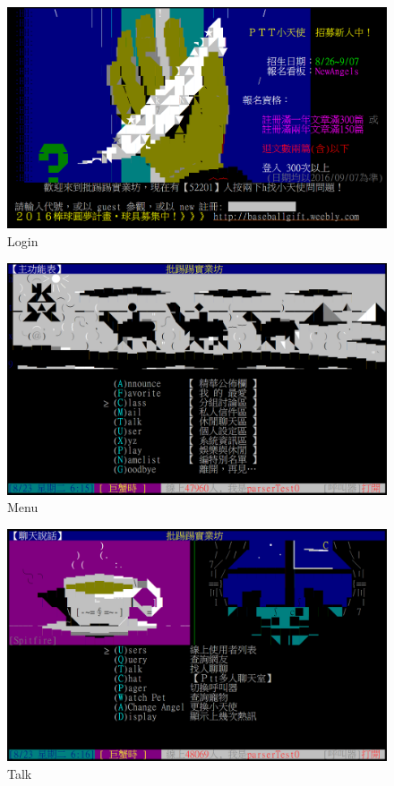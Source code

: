 \documentclass{beamer}
\begin{document}
\begin{figure}[t]
    \centering
    \includegraphics[width=1.0\textwidth]{figures/s0.png}
    \caption{Login}
\end{figure}
\begin{figure}[t]
    \centering
    \includegraphics[width=1.0\textwidth]{figures/s1.png}
    \caption{Menu}
\end{figure}
\begin{figure}[t]
    \centering
    \includegraphics[width=1.0\textwidth]{figures/s2.png}
    \caption{Talk}
\end{figure}
\end{document}
